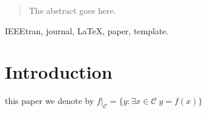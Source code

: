 \documentclass[journal]{IEEEtran}
\theoremstyle{remark}
\theoremstyle{definition}
\begin{document}







\maketitle

\begin{abstract}
The abstract goes here.
\end{abstract}

\begin{IEEEkeywords}
IEEEtran, journal, \LaTeX, paper, template.
\end{IEEEkeywords}






%
\IEEEpeerreviewmaketitle

\def\genmat{\Xi} \def\genvec{\xi}

\section{Introduction}
% 
% 
% 
% 
 this paper we denote by $f\vert_{\mathcal C} = \{y:\exists x\in\mathcal C\;y=f(x)\}$
\end{document}
